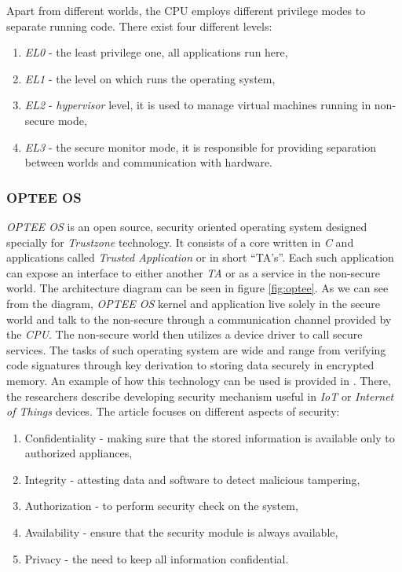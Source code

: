 Apart from different worlds, the CPU employs different privilege modes to separate running code. There exist four different levels:
\begin{enumerate}
    \item \textit{EL0} - the least privilege one, all applications run here,
    \item \textit{EL1} - the level on which runs the operating system,
    \item \textit{EL2} - \textit{hypervisor} level, it is used to manage virtual machines running in non-secure mode,
    \item \textit{EL3} - the secure monitor mode, it is responsible for providing separation between worlds and communication with hardware.
\end{enumerate}

\subsubsection{OPTEE OS}
\textit{OPTEE OS} is an open source, security oriented operating system designed specially for \textit{Trustzone} technology. It consists of a core written in \textit{C} and applications called \textit{Trusted Application} or in short “TA's”. Each such application can expose an interface to either another \textit{TA} or as a service in the non-secure world. The architecture diagram can be seen in figure \ref{fig:optee}. As we can see from the diagram, \textit{OPTEE OS} kernel and application live solely in the secure world and talk to the non-secure through a communication channel provided by the \textit{CPU}. The non-secure world then utilizes a device driver to call secure services. The tasks of such operating system are wide and range from verifying code signatures through key derivation to storing data securely in encrypted memory. An example of how this technology can be used is provided in \cite{opteeusage}. There, the researchers describe developing security mechanism useful in \textit{IoT} or \textit{Internet of Things} devices. The article focuses on different aspects of security:
\begin{enumerate}
    \item Confidentiality - making sure that the stored information is available only to authorized appliances, 
    \item Integrity - attesting data and software to detect malicious tampering,
    \item Authorization - to perform security check on the system,
    \item Availability - ensure that the security module is always available,
    \item Privacy - the need to keep all information confidential.
\end{enumerate}

